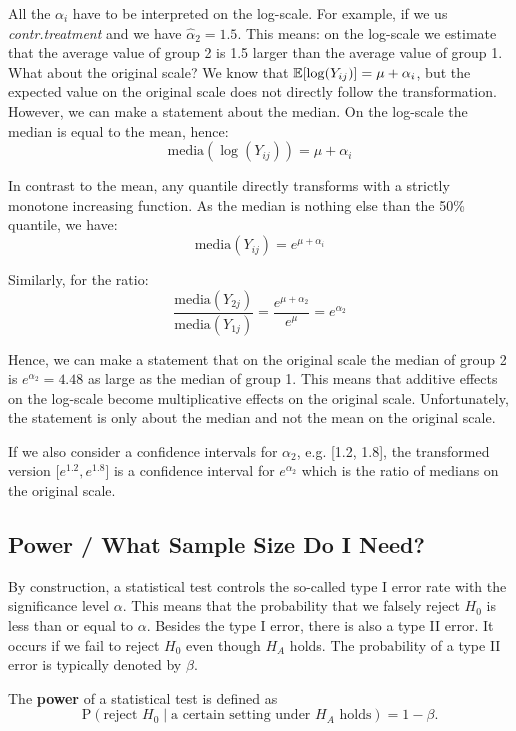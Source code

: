 All the $\alpha_i$ have to be interpreted on the log-scale. For example, if we us \textit{contr.treatment} and we have $\hat \alpha_2 = 1.5$. This means: on the log-scale we estimate that the average value of group 2 is 1.5 larger than the average value of group 1. What about the original scale? We know that $\mathbb{E}[\log(Y_{ij})] = \mu + \alpha_i$, but the expected value on the original scale does not directly follow the transformation. However, we can make a statement about the median. On the log-scale the median is equal to the mean, hence:
$$\text{media}(\log(Y_{ij})) = \mu + \alpha_i$$

In contrast to the mean, any quantile directly transforms with a strictly monotone increasing function. As the median is nothing else than the 50\% quantile, we have:
$$\text{media}(Y_{ij}) = e^{\mu + \alpha_i}$$

Similarly, for the ratio:
$$\frac{\text{media}(Y_{2j})}{\text{media}(Y_{1j})} = \frac{e^{\mu + \alpha_2}}{e^{\mu}} = e^{\alpha_2}$$

Hence, we can make a statement that on the original scale the median of group 2 is $e^{\alpha_2} = 4.48$ as large as the median of group 1. This means that additive effects on the log-scale become multiplicative effects on the original scale. Unfortunately, the statement is only about the median and not the mean on the original scale. \medskip

If we also consider a confidence intervals for $\alpha_2$, e.g. [1.2, 1.8], the transformed version [$e^{1.2}, e^{1.8}$] is a confidence interval for $e^{\alpha_2}$ which is the ratio of medians on the original scale.

\subsection{Power / What Sample Size Do I Need?}

By construction, a statistical test controls the so-called type I error rate with the significance level $\alpha$. This means that the probability that we falsely reject $H_0$ is less than or equal to $\alpha$. Besides the type I error, there is also a type II error. It occurs if we fail to reject $H_0$ even though $H_A$ holds. The probability of a type II error is typically denoted by $\beta$. \medskip

The \textbf{power} of a statistical test is defined as 
$$\text{P}(\text{reject } H_0 \; | \; \text{a certain setting under } H_A \text{ holds}) = 1 - \beta.$$

